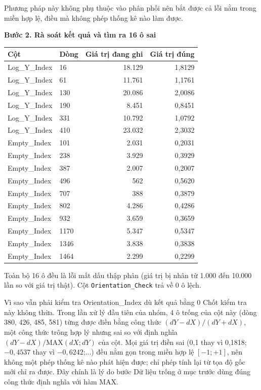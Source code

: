 \documentclass[12pt]{article}
\begin{document}
\noindent
Phương pháp này không phụ thuộc vào phân phối nên bắt được cả lỗi nằm trong miền hợp lệ, điều mà không phép thống kê nào làm được.

\noindent
\textbf{Bước 2. Rà soát kết quả và tìm ra 16 ô sai}

\begin{center}
\begin{tabular}{@{}llrr@{}}
\toprule
\textbf{Cột} & \textbf{Dòng} & \textbf{Giá trị đang ghi} & \textbf{Giá trị đúng} \\
\midrule
Log\_Y\_Index & 16   & 18.129 & 1,8129 \\
Log\_Y\_Index & 61   & 11.761 & 1,1761 \\
Log\_Y\_Index & 130  & 20.086 & 2,0086 \\
Log\_Y\_Index & 190  & 8.451  & 0,8451 \\
Log\_Y\_Index & 331  & 10.792 & 1,0792 \\
Log\_Y\_Index & 410  & 23.032 & 2,3032 \\
\midrule
Empty\_Index  & 101  & 2.031  & 0,2031 \\
Empty\_Index  & 238  & 3.929  & 0,3929 \\
Empty\_Index  & 387  & 2.007  & 0,2007 \\
Empty\_Index  & 496  & 562    & 0,5620 \\
Empty\_Index  & 707  & 388    & 0,3879 \\
Empty\_Index  & 802  & 4.286  & 0,4286 \\
Empty\_Index  & 932  & 3.659  & 0,3659 \\
Empty\_Index  & 1170 & 5.347  & 0,5347 \\
Empty\_Index  & 1346 & 3.838  & 0,3838 \\
Empty\_Index  & 1464 & 2.299  & 0,2299 \\
\bottomrule
\end{tabular}
\end{center}

\noindent
Toàn bộ 16 ô đều là lỗi mất dấu thập phân (giá trị bị nhân từ 1.000 đến 10.000 lần so với giá trị thật). Cột \texttt{Orientation\_Check} trả về 0 ô lệch.

\begin{guidelinebox}{Vì sao vẫn phải kiểm tra Orientation\_Index dù kết quả bằng 0}
Chốt kiểm tra này không thừa. Trong lần xử lý đầu tiên của nhóm, 4 ô trống của cột này (dòng 380, 426, 485, 581) từng được điền bằng công thức $(dY-dX)/(dY+dX)$, một công thức trông hợp lý nhưng sai so với định nghĩa $(dY-dX)/\mathrm{MAX}(dX;dY)$ của cột. Mọi giá trị điền sai (0,1 thay vì 0,1818; $-0{,}4537$ thay vì $-0{,}6242$;...) đều nằm gọn trong miền hợp lệ $[-1; +1]$, nên không một phép thống kê nào phát hiện được; chỉ phép tính lại từ tọa độ gốc mới chỉ ra được. Đây chính là lý do bước Dữ liệu trống ở mục trước dùng đúng công thức định nghĩa với hàm MAX.
\end{guidelinebox}
\end{document}
